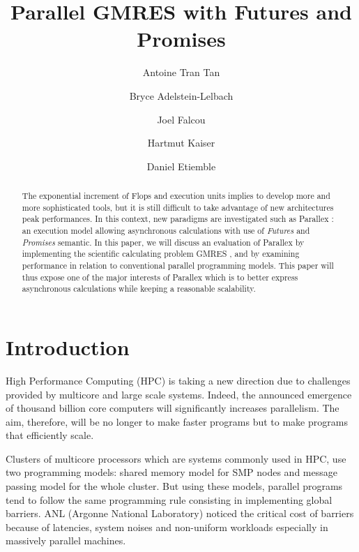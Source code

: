 \documentclass{llncs}
\begin{document}
\title{Parallel GMRES with Futures and Promises}

\author{Antoine Tran Tan \and Bryce Adelstein-Lelbach \and Joel Falcou \and Hartmut Kaiser \and
Daniel Etiemble }

\maketitle

\begin{abstract}
The exponential increment of Flops and execution units implies to develop more
and more sophisticated tools, but it is still difficult to take advantage of
new architectures peak performances. In this context, new paradigms are
investigated such as Parallex \cite{Parallex}: an execution model allowing
asynchronous calculations with use of \emph{Futures} and \emph{Promises}
semantic. In this paper, we will discuss an evaluation of Parallex by
implementing the scientific calculating problem GMRES \cite{GMRES}, and by
examining performance in relation to conventional parallel programming models.
This paper will thus expose one of the major interests of Parallex which is to
better express asynchronous calculations while keeping a reasonable
scalability. 
\end{abstract}


\section{Introduction}\label{Introduction}
High Performance Computing (HPC) is taking a new direction due to challenges
provided by multicore and large scale systems. Indeed, the announced emergence
of thousand billion core computers will significantly increases parallelism.
The aim, therefore, will be no longer to make faster programs but to make
programs that efficiently scale.\smallskip 

Clusters of multicore processors which are systems commonly used in HPC, use
two programming models: shared memory model for SMP nodes and message passing
model for the whole cluster. But using these models, parallel programs tend to
follow the same programming rule consisting in implementing global barriers.
ANL (Argonne National Laboratory) \cite{?} noticed the critical cost of barriers because
of latencies, system noises and non-uniform workloads especially in massively
parallel machines.\smallskip 
\end{document}
